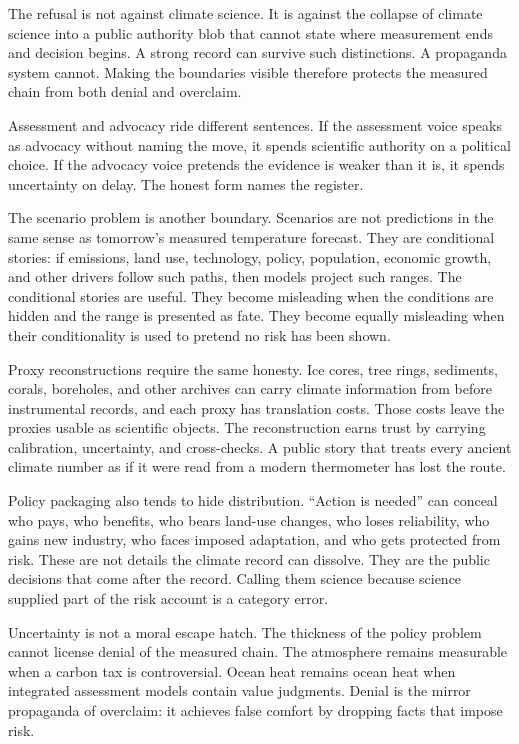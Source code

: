 The refusal is not against climate science. It is against the
collapse of climate science into a public authority blob that cannot
state where measurement ends and decision begins. A strong record can
survive such distinctions. A propaganda system cannot. Making the
boundaries visible therefore protects the measured chain from both
denial and overclaim.

Assessment and advocacy ride different sentences. If the assessment
voice speaks as advocacy without naming the move, it spends scientific
authority on a political choice. If the advocacy voice pretends the
evidence is weaker than it is, it spends uncertainty on delay. The
honest form names the register.

The scenario problem is another boundary. Scenarios are not
predictions in the same sense as tomorrow's measured temperature
forecast. They are conditional stories: if emissions, land use,
technology, policy, population, economic growth, and other drivers
follow such paths, then models project such ranges. The conditional
stories are useful. They become misleading when the conditions are
hidden and the range is presented as fate. They become equally
misleading when their conditionality is used to pretend no risk has
been shown.

Proxy reconstructions require the same honesty. Ice cores, tree rings,
sediments, corals, boreholes, and other archives can carry climate
information from before instrumental records, and each proxy has
translation costs. Those costs leave the proxies usable as scientific
objects. The reconstruction earns trust by carrying calibration,
uncertainty, and cross-checks. A public story that treats every
ancient climate number as if it were read from a modern thermometer
has lost the route.

Policy packaging also tends to hide distribution. ``Action is needed''
can conceal who pays, who benefits, who bears land-use changes, who
loses reliability, who gains new industry, who faces imposed
adaptation, and who gets protected from risk. These are not details the
climate record can dissolve. They are the public decisions that come
after the record. Calling them science because science supplied part of
the risk account is a category error.

Uncertainty is not a moral escape hatch. The thickness of the policy
problem cannot license denial of the measured chain. The atmosphere
remains measurable when a carbon tax is controversial. Ocean heat
remains ocean heat when integrated assessment models contain value
judgments. Denial is the mirror propaganda of overclaim: it achieves
false comfort by dropping facts that impose risk.


